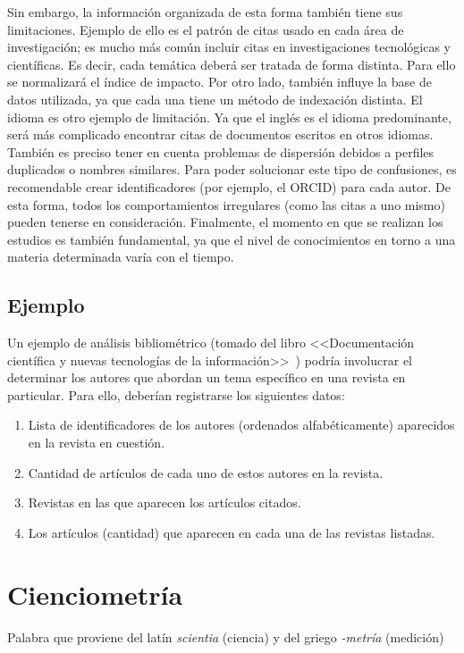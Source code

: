 Sin embargo, la información organizada de esta forma también tiene sus limitaciones. Ejemplo de ello es el patrón de citas usado en cada área de investigación; es mucho más común incluir citas en investigaciones tecnológicas y científicas. Es decir, cada temática deberá ser tratada de forma distinta. Para ello se normalizará el índice de impacto.
Por otro lado, también influye la base de datos utilizada, ya que cada una tiene un método de indexación distinta.
El idioma es otro ejemplo de limitación. Ya que el inglés es el idioma predominante, será más complicado encontrar citas de documentos 	escritos en otros idiomas.
También es preciso tener en cuenta problemas de dispersión debidos a perfiles duplicados o nombres similares. Para poder solucionar este tipo de confusiones, es recomendable crear identificadores (por ejemplo, el ORCID) para cada autor.
De esta forma, todos los comportamientos irregulares (como las citas a uno mismo) pueden tenerse en consideración.
Finalmente, el momento en que se realizan los estudios es también fundamental, ya que el nivel de conocimientos en torno a una materia determinada varía con el tiempo.

\subsection{Ejemplo}

Un ejemplo de análisis bibliométrico (tomado del libro <<Documentación científica y nuevas tecnologías de la información>>~\cite{Amat1989}) podría involucrar el determinar los autores que abordan un tema específico en una revista en particular. Para ello, deberían registrarse los siguientes datos:
\begin{enumerate}
    \item Lista de identificadores de los autores (ordenados alfabéticamente) aparecidos en la revista en cuestión.
    \item Cantidad de artículos de cada uno de estos autores en la revista.
    \item Revistas en las que aparecen los artículos citados.
    \item Los artículos (cantidad) que aparecen en cada una de las revistas listadas.
\end{enumerate}


\section{Cienciometría}

Palabra que proviene del latín  \textit{scientia} (ciencia) y del griego \textit{-metría} (medición)

